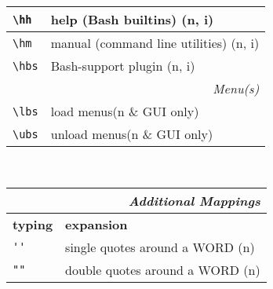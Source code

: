 \documentclass[oneside,12pt,a4paper,DIV18]{scrartcl}
\begin{document}
\begin{center}
\begin{tabular}[]{|p{11mm}|p{59mm}|}
\hline \verb'\hh'  & help (Bash builtins)            \hfill (n, i)\\
\hline \verb'\hm'  & manual (command line utilities) \hfill (n, i)\\
\hline \verb'\hbs' & Bash-support plugin             \hfill (n, i)\\
\hline 
\hline
\multicolumn{2}{|r|}{\textsl{Menu(s)}}\\
\hline \verb'\lbs'  & load    menus\hfill \scriptsize{(n \& GUI only)}\\
\hline \verb'\ubs'  & unload  menus\hfill \scriptsize{(n \& GUI only)}\\
\hline 
\end{tabular}\\%
%
\begin{minipage}[b]{70mm}%
\setlength{\fboxsep}{.25mm}%
\begin{spacing}{1.1}%
\begin{tabular}[]{|p{11mm}|p{55mm}|}%
\hline
\multicolumn{2}{|r|}{\textsl{Additional Mappings}}\\
\hline
\hline \textbf{typing}& \textbf{expansion}\\
\hline \verb"''"      & single quotes around a WORD    \hfill (n)\\
\hline \verb'""'      & double quotes around a WORD    \hfill (n)\\
\hline
\end{tabular}
\end{spacing}
\end{minipage}%
%
\end{center}
\end{document}
